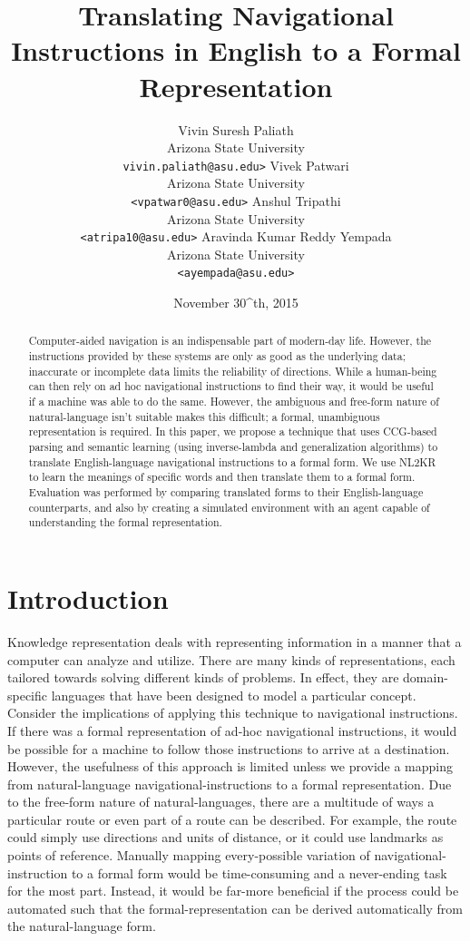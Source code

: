 \documentclass[11pt,letterpaper]{article}
\title{Translating Navigational Instructions in English to a Formal Representation}
\author{
    Vivin Suresh Paliath\\
    Arizona State University\\	    
    {\tt vivin.paliath@asu.edu>}
\And
    Vivek Patwari\\
    Arizona State University\\
    {\tt <vpatwar0@asu.edu>}
\AND    
    Anshul Tripathi\\
    Arizona State University\\
    {\tt <atripa10@asu.edu>}  
\And
    Aravinda Kumar Reddy Yempada\\
  	Arizona State University\\
    {\tt <ayempada@asu.edu>}
}
\date{November 30^{th}, 2015}
\begin{document}
\maketitle

\begin{abstract}
Computer-aided navigation is an indispensable part of modern-day life. However, the instructions provided by these systems are only as good as the underlying data; inaccurate or incomplete data limits the reliability of directions. While a human-being can then rely on ad hoc navigational instructions to find their way, it would be useful if a machine was able to do the same. However, the ambiguous and free-form nature of natural-language isn't suitable makes this difficult; a formal, unambiguous representation is required. In this paper, we propose a technique that uses CCG-based parsing and semantic learning (using inverse-lambda and generalization algorithms) to translate English-language navigational instructions to a formal form. We use NL2KR to learn the meanings of specific words and then translate them to a formal form. Evaluation was performed by comparing translated forms to their English-language counterparts, and also by creating a simulated environment with an agent capable of understanding the formal representation.
\end{abstract}

\section{Introduction}

Knowledge representation deals with representing information in a manner that a computer can analyze and utilize. There are many kinds of representations, each tailored towards solving different kinds of problems. In effect, they are domain-specific languages that have been designed to model a particular concept. Consider the implications of applying this technique to navigational instructions. If there was a formal representation of ad-hoc navigational instructions, it would be possible for a machine to follow those instructions to arrive at a destination. However, the usefulness of this approach is limited unless we provide a mapping from natural-language navigational-instructions to a formal representation. Due to the free-form nature of natural-languages, there are a multitude of ways a particular route or even part of a route can be described. For example, the route could simply use directions and units of distance, or it could use landmarks as points of reference. Manually mapping every-possible variation of navigational-instruction to a formal form would be time-consuming and a never-ending task for the most part. Instead, it would be far-more beneficial if the process could be automated such that the formal-representation can be derived automatically from the natural-language form.
\end{document}

